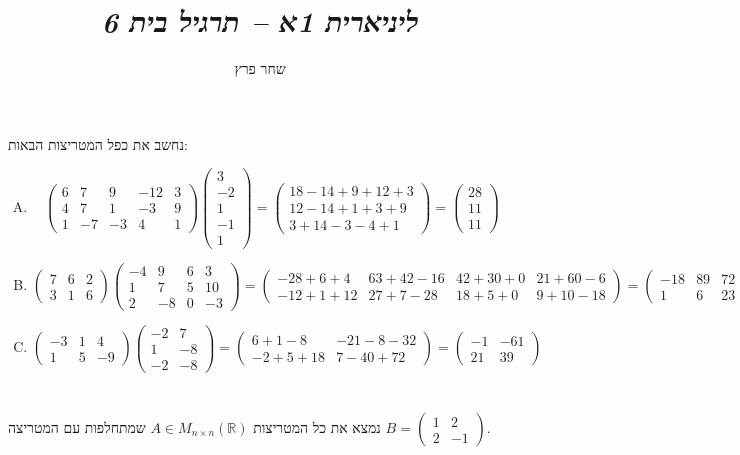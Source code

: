 \documentclass[]{article}
\author{שחר פרץ}
\title{\textit{ליניארית 1א – תרגיל בית 6}}
\newcommand\R     {\mathbb{R}}
\newcommand\pms[1]    {\begin{pmatrix}
		#1
\end{pmatrix}}
\begin{document}
	\maketitle
	\section{}
	נחשב את כפל המטריצות הבאות: 
	\begin{enumerate}[A.]
		\item 
		\[ \pms{6 & 7 & 9 & -12 & 3 \\ 4 & 7 & 1 & -3 & 9 \\ 1 & -7 & -3 & 4 & 1}\pms{3 \\ -2 \\ 1 \\ -1 \\ 1} = 
		\pms{18 -14 + 9 + 12 + 3 \\ 12 -14 + 1 + 3 + 9 \\ 3 + 14 - 3 - 4 + 1} = \pms{28 \\ 11 \\ 11} \]
		\item 
		\[ \pms{7 & 6 & 2 \\ 3 & 1 & 6}\pms{-4 & 9 & 6 & 3 \\ 1 & 7 & 5 & 10 \\ 2 & -8 & 0 & -3} = \pms{-28 + 6 + 4 & 63 + 42 - 16 & 42 + 30 + 0 & 21 + 60 -6 \\ -12 + 1 + 12 & 27 + 7 - 28 & 18 + 5 + 0 & 9 + 10 -18} = \pms{-18 & 89 & 72 & 75 \\ 1 & 6 & 23 & 1} \]
		\item 
		\[ \pms{-3 & 1 & 4 \\ 1 & 5 & -9}\pms{-2 & 7 \\ 1 & -8 \\ -2 & -8} = \pms{6 + 1 - 8 & -21 -8 -32 \\ -2 + 5 + 18 & 7 -40 + 72} = \pms{-1 & -61 \\ 21 & 39} \]
	\end{enumerate}
	
	\section{}
	נמצא את כל המטריצות $A \in M_{n \times n}(\R)$ שמתחלפות עם המטריצה $B = \pms{1 & 2 \\ 2 & -1}$. 
	
\end{document}
